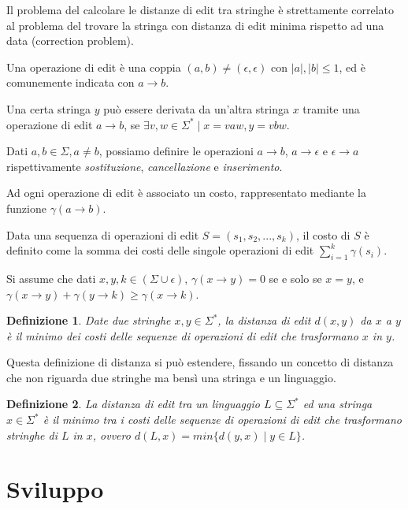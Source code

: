\documentclass[a4paper,12pt]{report}
\newtheorem{definition}{Definizione}[chapter]
\begin{document}
    Il problema del calcolare le distanze di edit tra stringhe è strettamente correlato al problema del trovare la stringa con distanza di edit minima rispetto ad una data (correction problem).
    
    Una operazione di edit è una coppia $(a, b) \neq (\epsilon, \epsilon)$ con $\lvert a \rvert, \lvert b \rvert \leq 1$, ed è comunemente indicata con
    $a \rightarrow b$. 
    
    Una certa stringa $y$ può essere derivata da un'altra stringa $x$ tramite una operazione di edit $a \rightarrow b$, se $\exists v, w \in \Sigma^* \mid x = vaw, y = vbw$.
    
    Dati $a, b \in \Sigma, a \neq b$, possiamo definire le operazioni $a \rightarrow b$, $a \rightarrow \epsilon$ e $\epsilon \rightarrow a$ rispettivamente
    \textit{sostituzione}, \textit{cancellazione} e \textit{inserimento}.
    
    Ad ogni operazione di edit è associato un costo, rappresentato mediante la funzione $\gamma(a \rightarrow b)$.
    
    Data una sequenza di operazioni di edit $S = (s_1, s_2, ..., s_k)$, il costo di $S$ è definito come la somma dei costi delle singole operazioni di edit
    $\sum_{i=1}^{k} \gamma(s_i)$.

    Si assume che dati $x, y, k \in (\Sigma \cup \epsilon)$, $\gamma(x \rightarrow y) = 0$ se e solo se $x = y$, e $\gamma(x \rightarrow y)
    + \gamma(y \rightarrow k) \geq \gamma(x \rightarrow k)$.

    \begin{definition}
        Date due stringhe $x, y \in \Sigma^*$, la distanza di edit $d(x, y)$ da $x$ a $y$ è il minimo dei costi delle sequenze di operazioni di edit che trasformano $x$ in $y$.
    \end{definition}

    Questa definizione di distanza si può estendere, fissando un concetto di distanza che non riguarda due stringhe ma bensì una stringa e un linguaggio.
    
    \begin{definition}
        La distanza di edit tra un linguaggio $L \subseteq \Sigma^*$ ed una stringa $x \in \Sigma^*$ è il minimo tra i costi delle sequenze di operazioni di edit
        che trasformano stringhe di $L$ in $x$, ovvero $d(L, x) = min\{d(y, x) \mid y \in L \}$.
    \end{definition}


    \chapter{Sviluppo}
\end{document}
